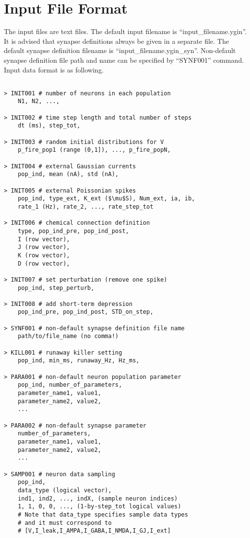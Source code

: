 \documentclass{article}
\begin{document}
\section{Input File Format}

The input files are text files.
The default input filename is ``input\_filename.ygin''.
It is advised that synapse definitions always be given in a separate file.
The default synapse definition filename is ``input\_filename.ygin\_syn''.
Non-default synapse definition file path and name can be specified by ``SYNF001'' command.
Input data format is as following.




\begin{lstlisting}[mathescape]

> INIT001 # number of neurons in each population
	N1, N2, ...,

> INIT002 # time step length and total number of steps
	dt (ms), step_tot,

> INIT003 # random initial distributions for V
	p_fire_pop1 (range (0,1]), ..., p_fire_popN, 

> INIT004 # external Gaussian currents
	pop_ind, mean (nA), std (nA), 

> INIT005 # external Poissonian spikes
	pop_ind, type_ext, K_ext ($\mu$S), Num_ext, ia, ib,
	rate_1 (Hz), rate_2, ..., rate_step_tot

> INIT006 # chemical connection definition
	type, pop_ind_pre, pop_ind_post,
	I (row vector),
	J (row vector),
	K (row vector),
	D (row vector),

> INIT007 # set perturbation (remove one spike)
	pop_ind, step_perturb,

> INIT008 # add short-term depression
	pop_ind_pre, pop_ind_post, STD_on_step,
	
> SYNF001 # non-default synapse definition file name
	path/to/file_name (no comma!)

> KILL001 # runaway killer setting
	pop_ind, min_ms, runaway_Hz, Hz_ms,

> PARA001 # non-default neuron population parameter
	pop_ind, number_of_parameters,
	parameter_name1, value1,
	parameter_name2, value2,
	...
 
> PARA002 # non-default synapse parameter
	number_of_parameters,
	parameter_name1, value1,
	parameter_name2, value2,
	...

> SAMP001 # neuron data sampling 
	pop_ind,
	data_type (logical vector),
	ind1, ind2, ..., indX, (sample neuron indices)
	1, 1, 0, 0, ..., (1-by-step_tot logical values)
	# Note that data_type specifies sample data types
	# and it must correspond to 
	# [V,I_leak,I_AMPA,I_GABA,I_NMDA,I_GJ,I_ext]


\end{lstlisting}
\end{document}
